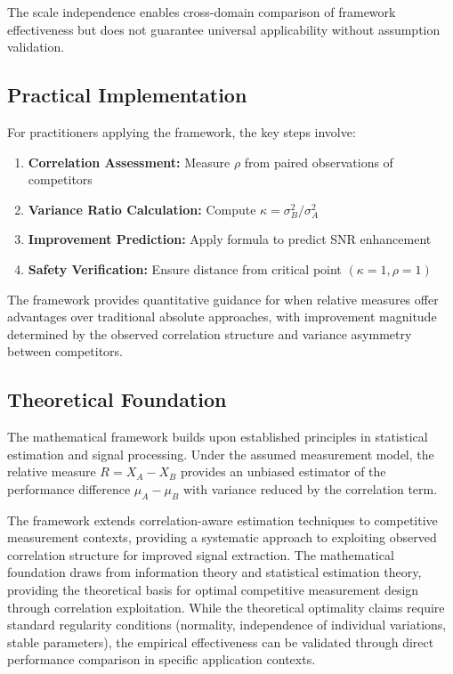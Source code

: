 The scale independence enables cross-domain comparison of framework effectiveness but does not guarantee universal applicability without assumption validation.

\subsection{Practical Implementation}

For practitioners applying the framework, the key steps involve:

\begin{enumerate}
    \item \textbf{Correlation Assessment:} Measure $\rho$ from paired observations of competitors
    \item \textbf{Variance Ratio Calculation:} Compute $\kappa = \sigma_B^2/\sigma_A^2$
    \item \textbf{Improvement Prediction:} Apply formula to predict SNR enhancement
    \item \textbf{Safety Verification:} Ensure distance from critical point $(\kappa=1, \rho=1)$
\end{enumerate}

The framework provides quantitative guidance for when relative measures offer advantages over traditional absolute approaches, with improvement magnitude determined by the observed correlation structure and variance asymmetry between competitors.

\subsection{Theoretical Foundation}

The mathematical framework builds upon established principles in statistical estimation and signal processing. Under the assumed measurement model, the relative measure $R = X_A - X_B$ provides an unbiased estimator of the performance difference $\mu_A - \mu_B$ with variance reduced by the correlation term.

The framework extends correlation-aware estimation techniques to competitive measurement contexts, providing a systematic approach to exploiting observed correlation structure for improved signal extraction. The mathematical foundation draws from information theory \cite{shannon1948mathematical} and statistical estimation theory, providing the theoretical basis for optimal competitive measurement design through correlation exploitation. While the theoretical optimality claims require standard regularity conditions (normality, independence of individual variations, stable parameters), the empirical effectiveness can be validated through direct performance comparison in specific application contexts.

